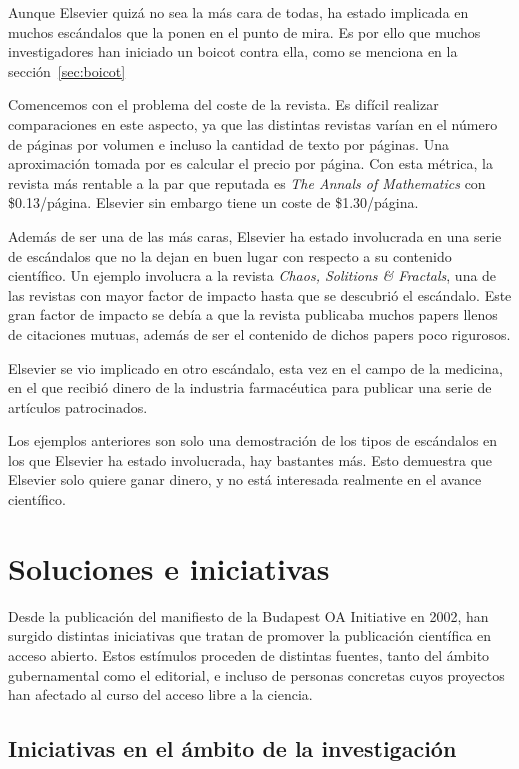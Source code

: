 Aunque Elsevier quizá no sea la más cara de todas, ha estado implicada en muchos escándalos que la ponen en el punto de mira. Es por ello que muchos investigadores han iniciado un boicot contra ella, como se menciona en la sección~\ref{sec:boicot}

Comencemos con el problema del coste de la revista. Es difícil realizar comparaciones en este aspecto, ya que las distintas revistas varían en el número de páginas por volumen e incluso la cantidad de texto por páginas. Una aproximación tomada por \cite{costknowledge} es calcular el precio por página. Con esta métrica, la revista más rentable a la par que reputada es \textit{The Annals of Mathematics} con \$0.13/página. Elsevier sin embargo tiene un coste de \$1.30/página.

Además de ser una de las más caras, Elsevier ha estado involucrada en una serie de escándalos que no la dejan en buen lugar con respecto a su contenido científico. Un ejemplo involucra a la revista \textit{Chaos, Solitions \& Fractals}, una de las revistas con mayor factor de impacto hasta que se descubrió el escándalo. Este gran factor de impacto se debía a que la revista publicaba muchos papers llenos de citaciones mutuas, además de ser el contenido de dichos papers poco rigurosos.

Elsevier se vio implicado en otro escándalo, esta vez en el campo de la medicina, en el que recibió dinero de la industria farmacéutica para publicar una serie de artículos patrocinados.

Los ejemplos anteriores son solo una demostración de los tipos de escándalos en los que Elsevier ha estado involucrada, hay bastantes más. Esto demuestra que Elsevier solo quiere ganar dinero, y no está interesada realmente en el avance científico.

\section{Soluciones e iniciativas}

Desde la publicación del manifiesto de la Budapest OA Initiative \cite{boai} en 2002, han surgido distintas iniciativas que tratan de promover la publicación científica en acceso abierto. Estos estímulos proceden de distintas fuentes, tanto del ámbito gubernamental como el editorial, e incluso de personas concretas cuyos proyectos han afectado al curso del acceso libre a la ciencia.

\subsection{Iniciativas en el ámbito de la investigación}

